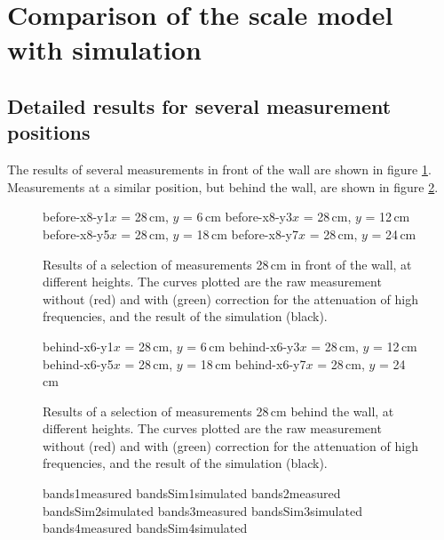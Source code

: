 \section{Comparison of the scale model with simulation \label{sectComparison}}

\subsection{Detailed results for several measurement positions}
The results of several measurements in front of the wall are shown in figure \ref{beforePlots}. Measurements at a similar position, but behind the wall, are shown in figure \ref{behindPlots}.


\begin{figure}
\figOctaveTwoNoFigNoCaption{-0.0cm}
	{before-x8-y1}{$x$ = 28\,cm, $y$ = 6\,cm}
	{before-x8-y3}{$x$ = 28\,cm, $y$ = 12\,cm}
\figOctaveTwoNoFigNoCaption{-0.0cm}
	{before-x8-y5}{$x$ = 28\,cm, $y$ = 18\,cm}
	{before-x8-y7}{$x$ = 28\,cm, $y$ = 24\,cm}
\caption{Results of a selection of measurements 28\,cm in front of the wall, at different heights. The curves plotted are the raw measurement without (red) and with (green) correction for the attenuation of high frequencies, and the result of the simulation (black). \label{beforePlots}}
\end{figure}

\begin{figure}
\figOctaveTwoNoFigNoCaption{-0.0cm}
	{behind-x6-y1}{$x$ = 28\,cm, $y$ = 6\,cm}
	{behind-x6-y3}{$x$ = 28\,cm, $y$ = 12\,cm}
\figOctaveTwoNoFigNoCaption{-0.0cm}
	{behind-x6-y5}{$x$ = 28\,cm, $y$ = 18\,cm}
	{behind-x6-y7}{$x$ = 28\,cm, $y$ = 24\,cm}
\caption{Results of a selection of measurements 28\,cm behind the wall, at different heights. The curves plotted are the raw measurement without (red) and with (green) correction for the attenuation of high frequencies, and the result of the simulation (black). \label{behindPlots}}
\end{figure}

\begin{figure}
	{bands1}{measured}
	{bandsSim1}{simulated}
	{bands2}{measured}
	{bandsSim2}{simulated}
	{bands3}{measured}
	{bandsSim3}{simulated}
	{bands4}{measured}
	{bandsSim4}{simulated}
\end{figure}


